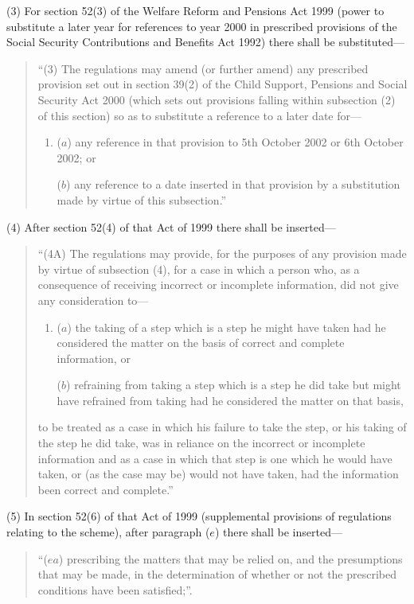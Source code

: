 \documentclass[12pt,a4paper]{article}
\begin{document}
(3) For section 52(3)  of the Welfare Reform and Pensions Act 1999 (power to substitute a later year for references to year 2000 in prescribed provisions of the Social Security Contributions and Benefits Act 1992) there shall be substituted—
\begin{quotation}
“(3) The regulations may amend (or further amend) any prescribed provision set out in section 39(2)  of the Child Support, Pensions and Social Security Act 2000 (which sets out provisions falling within subsection (2)  of this section) so as to substitute a reference to a later date for—
\begin{enumerate}\item[]
($a$) any reference in that provision to 5th October 2002 or 6th October 2002; or

($b$) any reference to a date inserted in that provision by a substitution made by virtue of this subsection.”
\end{enumerate}
\end{quotation}

(4) After section 52(4)  of that Act of 1999 there shall be inserted—
\begin{quotation}
“(4A) The regulations may provide, for the purposes of any provision made by virtue of subsection (4), for a case in which a person who, as a consequence of receiving incorrect or incomplete information, did not give any consideration to—
\begin{enumerate}\item[]
($a$) the taking of a step which is a step he might have taken had he considered the matter on the basis of correct and complete information, or

($b$) refraining from taking a step which is a step he did take but might have refrained from taking had he considered the matter on that basis,
\end{enumerate}
to be treated as a case in which his failure to take the step, or his taking of the step he did take, was in reliance on the incorrect or incomplete information and as a case in which that step is one which he would have taken, or (as the case may be) would not have taken, had the information been correct and complete.”
\end{quotation}

(5) In section 52(6)  of that Act of 1999 (supplemental provisions of regulations relating to the scheme), after paragraph ($e$)  there shall be inserted—
\begin{quotation}
“($ea$) prescribing the matters that may be relied on, and the presumptions that may be made, in the determination of whether or not the prescribed conditions have been satisfied;”.
\end{quotation}
\end{document}
